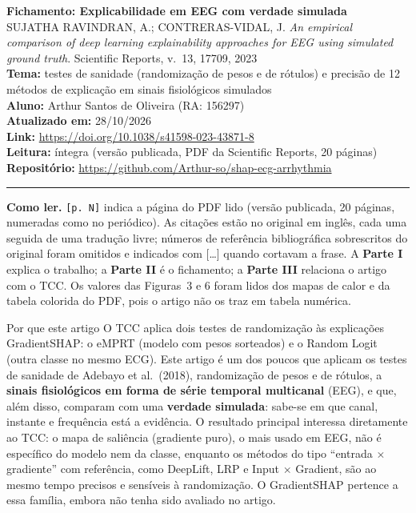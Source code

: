 \documentclass[11pt,a4paper]{article}
\begin{document}
\begin{center}
    {\LARGE \textbf{Fichamento: Explicabilidade em EEG com verdade simulada}} \\[0.35em]
    {\large SUJATHA RAVINDRAN, A.; CONTRERAS-VIDAL, J. \textit{An empirical comparison of deep learning explainability approaches for EEG using simulated ground truth}. Scientific Reports, v.~13, 17709, 2023} \\[0.3em]
    \textbf{Tema:} testes de sanidade (randomização de pesos e de rótulos) e precisão de 12 métodos de explicação em sinais fisiológicos simulados \\[0.2em]
    \textbf{Aluno:} Arthur Santos de Oliveira (RA: 156297) \\[0.2em]
    \textbf{Atualizado em:} 28/10/2026 \\[0.2em]
    \textbf{Link:} \url{https://doi.org/10.1038/s41598-023-43871-8} \\[0.2em]
    \textbf{Leitura:} íntegra (versão publicada, PDF da Scientific Reports, 20 páginas) \\[0.2em]
    \textbf{Repositório:} \url{https://github.com/Arthur-so/shap-ecg-arrhythmia}
\end{center}
\vspace{-0.5em}
\hrule
\vspace{0.8em}

\textbf{Como ler.} \texttt{[p. N]} indica a página do PDF lido (versão publicada, 20 páginas, numeradas como no periódico). As citações estão no original em inglês, cada uma seguida de uma tradução livre; números de referência bibliográfica sobrescritos do original foram omitidos e indicados com [\ldots] quando cortavam a frase. A \textbf{Parte I} explica o trabalho; a \textbf{Parte II} é o fichamento; a \textbf{Parte III} relaciona o artigo com o TCC. Os valores das Figuras~3 e 6 foram lidos dos mapas de calor e da tabela colorida do PDF, pois o artigo não os traz em tabela numérica.

\begin{infobox}[note]{Por que este artigo}
O TCC aplica dois testes de randomização às explicações GradientSHAP: o eMPRT (modelo com pesos sorteados) e o Random Logit (outra classe no mesmo ECG). Este artigo é um dos poucos que aplicam os testes de sanidade de Adebayo et al.\ (2018), randomização de pesos e de rótulos, a \textbf{sinais fisiológicos em forma de série temporal multicanal} (EEG), e que, além disso, comparam com uma \textbf{verdade simulada}: sabe-se em que canal, instante e frequência está a evidência. O resultado principal interessa diretamente ao TCC: o mapa de saliência (gradiente puro), o mais usado em EEG, não é específico do modelo nem da classe, enquanto os métodos do tipo “entrada $\times$ gradiente” com referência, como DeepLift, LRP e Input $\times$ Gradient, são ao mesmo tempo precisos e sensíveis à randomização. O GradientSHAP pertence a essa família, embora não tenha sido avaliado no artigo.
\end{infobox}
\end{document}
